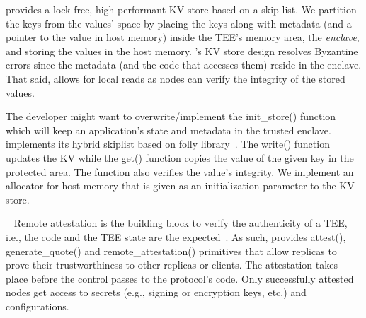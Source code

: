 \fi


\label{subsec:KV}
\projecttitle{} provides a lock-free, high-performant KV store based on a skip-list. We partition the keys from the values' space by placing the keys along with metadata (and a pointer to the value in host memory) inside the TEE's memory area, the {\em enclave}, and storing the values in the host memory. %
\projecttitle{}'s KV store design resolves Byzantine errors since the metadata (and the code that accesses them) reside in the enclave. That said, \projecttitle{} allows for local reads as nodes can verify the integrity of the stored values.

 The developer might want to overwrite/implement the init\_store() function which will keep an application's state and metadata in the trusted enclave. \projecttitle{} implements its hybrid skiplist based on folly library~\cite{folly}. The write() function updates the KV while the get() function copies the value of the given key in the protected area. The function also verifies the value's integrity. We implement an allocator for host memory that is given as an initialization parameter to the KV store.

\fi 






~\label{subsec:attestation}
Remote attestation is the building block to verify the authenticity of a TEE, i.e., the code and the TEE state are the expected~\cite{Parno2010}. As such, \projecttitle{} provides attest(), generate\_quote() and remote\_attestation() primitives  that allow replicas to prove their trustworthiness to other replicas or clients. The attestation takes place before the control passes to the protocol's code. Only successfully attested nodes get access to secrets (e.g., signing or encryption keys, etc.) and configurations. 

